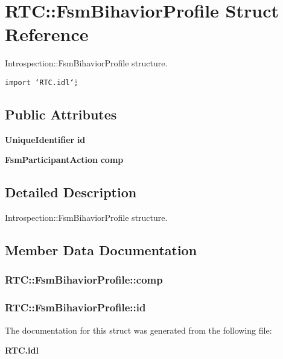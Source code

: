 \section{RTC::Fsm\-Bihavior\-Profile Struct Reference}
\label{structRTC_1_1FsmBihaviorProfile}
Introspection::Fsm\-Bihavior\-Profile structure.  


{\tt import \char`\"{}RTC.idl\char`\"{};}

\subsection*{Public Attributes}
\begin{CompactItemize}
\item 
{\bf Unique\-Identifier} {\bf id}
\item 
{\bf Fsm\-Participant\-Action} {\bf comp}
\end{CompactItemize}


\subsection{Detailed Description}
Introspection::Fsm\-Bihavior\-Profile structure. 



\subsection{Member Data Documentation}
\subsubsection{ {\bf RTC::Fsm\-Bihavior\-Profile::comp}}\label{structRTC_1_1FsmBihaviorProfile_RTC_1_1FsmBihaviorProfileo1}


\subsubsection{ {\bf RTC::Fsm\-Bihavior\-Profile::id}}\label{structRTC_1_1FsmBihaviorProfile_RTC_1_1FsmBihaviorProfileo0}




The documentation for this struct was generated from the following file:\begin{CompactItemize}
\item 
{\bf RTC.idl}\end{CompactItemize}
